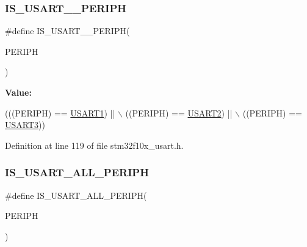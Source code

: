 \subsubsection{\texorpdfstring{I\+S\+\_\+\+U\+S\+A\+R\+T\+\_\+\_\+\+P\+E\+R\+I\+PH}{IS\_USART\_123\_PERIPH}}
{\footnotesize\ttfamily \#define I\+S\+\_\+\+U\+S\+A\+R\+T\+\_\+\_\+\+P\+E\+R\+I\+PH(\begin{DoxyParamCaption}\item[{}]{P\+E\+R\+I\+PH }\end{DoxyParamCaption})}

{\bfseries Value\+:}
\begin{DoxyCode}
(((PERIPH) == \hyperlink{group___peripheral__declaration_ga92871691058ff7ccffd7635930cb08da}{USART1}) || \(\backslash\)
                                     ((PERIPH) == \hyperlink{group___peripheral__declaration_gaf114a9eab03ca08a6fb720e511595930}{USART2}) || \(\backslash\)
                                     ((PERIPH) == \hyperlink{group___peripheral__declaration_ga2350115553c1fe0a7bc14e6a7ec6a225}{USART3}))
\end{DoxyCode}


Definition at line 119 of file stm32f10x\+\_\+usart.\+h.

\mbox{\label{group___u_s_a_r_t___exported___constants_gae890b8e77c1b84a77c485a353949f7eb}} 
\subsubsection{\texorpdfstring{I\+S\+\_\+\+U\+S\+A\+R\+T\+\_\+\+A\+L\+L\+\_\+\+P\+E\+R\+I\+PH}{IS\_USART\_ALL\_PERIPH}}
{\footnotesize\ttfamily \#define I\+S\+\_\+\+U\+S\+A\+R\+T\+\_\+\+A\+L\+L\+\_\+\+P\+E\+R\+I\+PH(\begin{DoxyParamCaption}\item[{}]{P\+E\+R\+I\+PH }\end{DoxyParamCaption})}

